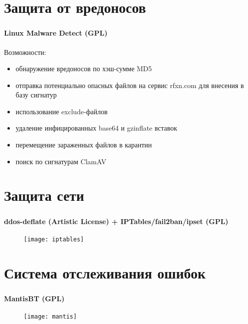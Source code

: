 
\section{Защита от вредоносов}

\begin{frame}
\frametitle{\insertsection}
\framesubtitle{Linux Malware Detect (GPL)}
Возможности:
\begin{itemize}
	\item обнаружение вредоносов по хэш-сумме MD5
	\item отправка потенциально опасных файлов на сервис rfxn.com для внесения в базу сигнатур
	\item использование exclude-файлов
	\item удаление инфицированных base64 и gzinflate вставок
	\item перемещение зараженных файлов в карантин
	\item поиск по сигнатурам ClamAV
\end{itemize}
\end{frame}


\section{Защита сети}

\begin{frame}
\frametitle{\insertsection}
\framesubtitle{ddos-deflate (Artistic License) + IPTables/fail2ban/ipset (GPL)}
\begin{figure}[h]
	\begin{center}
		\texttt{[image: iptables]}
	\end{center}
\end{figure}
\end{frame}


\section{Система отслеживания ошибок}

\begin{frame}
\frametitle{\insertsection}
\framesubtitle{MantisBT (GPL)}
\begin{figure}[h]
	\begin{center}
		\texttt{[image: mantis]}
	\end{center}
\end{figure}
\end{frame}

